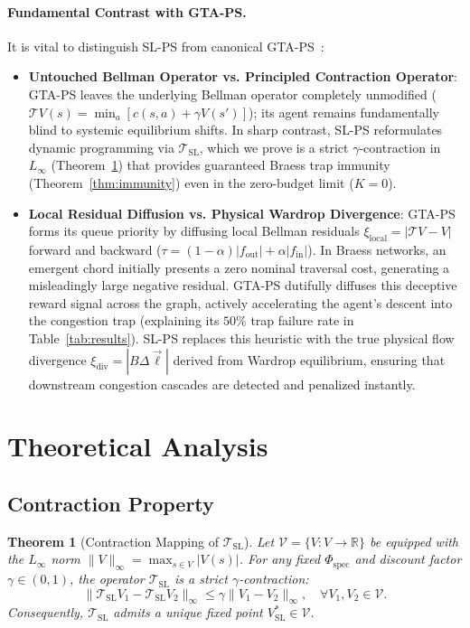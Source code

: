 \documentclass[11pt,a4paper]{article}
\newtheorem{theorem}{Theorem}
\begin{document}
\paragraph{Fundamental Contrast with GTA-PS.}
It is vital to distinguish SL-PS from canonical GTA-PS~\cite{gta_ps2025}:
\begin{itemize}
    \item \textbf{Untouched Bellman Operator vs. Principled Contraction Operator}: GTA-PS leaves the underlying Bellman operator completely unmodified ($\mathcal{T}V(s) = \min_a [c(s, a) + \gamma V(s')]$); its agent remains fundamentally blind to systemic equilibrium shifts. In sharp contrast, SL-PS reformulates dynamic programming via $\mathcal{T}_{\text{SL}}$, which we prove is a strict $\gamma$-contraction in $L_\infty$ (Theorem~\ref{thm:contraction}) that provides guaranteed Braess trap immunity (Theorem~\ref{thm:immunity}) even in the zero-budget limit ($K = 0$).
    \item \textbf{Local Residual Diffusion vs. Physical Wardrop Divergence}: GTA-PS forms its queue priority by diffusing local Bellman residuals $\xi_{\text{local}} = |\mathcal{T}V - V|$ forward and backward ($\tau = (1-\alpha) |f_{\text{out}}| + \alpha |f_{\text{in}}|$). In Braess networks, an emergent chord initially presents a zero nominal traversal cost, generating a misleadingly large negative residual. GTA-PS dutifully diffuses this deceptive reward signal across the graph, actively accelerating the agent's descent into the congestion trap (explaining its $50\%$ trap failure rate in Table~\ref{tab:results}). SL-PS replaces this heuristic with the true physical flow divergence $\xi_{\text{div}} = |B \Delta \vec{\ell}|$ derived from Wardrop equilibrium, ensuring that downstream congestion cascades are detected and penalized instantly.
\end{itemize}

\section{Theoretical Analysis}
\label{sec:theory}

\subsection{Contraction Property}
\begin{theorem}[Contraction Mapping of $\mathcal{T}_{\text{SL}}$]
\label{thm:contraction}
Let $\mathcal{V} = \{V: V \to \mathbb{R}\}$ be equipped with the $L_\infty$ norm $\|V\|_\infty = \max_{s \in V} |V(s)|$. For any fixed $\Phi_{\text{spec}}$ and discount factor $\gamma \in (0, 1)$, the operator $\mathcal{T}_{\text{SL}}$ is a strict $\gamma$-contraction:
\begin{equation}
\|\mathcal{T}_{\text{SL}} V_1 - \mathcal{T}_{\text{SL}} V_2\|_\infty \le \gamma \|V_1 - V_2\|_\infty, \quad \forall V_1, V_2 \in \mathcal{V}.
\end{equation}
Consequently, $\mathcal{T}_{\text{SL}}$ admits a unique fixed point $V_{\text{SL}}^* \in \mathcal{V}$.
\end{theorem}
\end{document}
